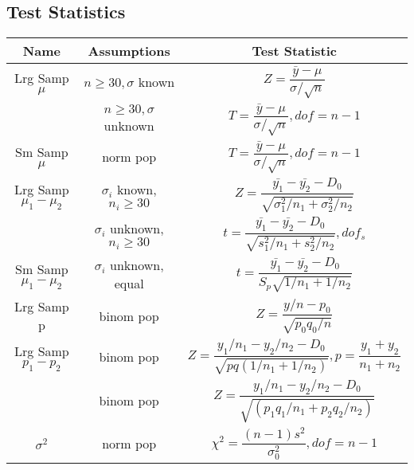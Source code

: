 \documentclass{article}
\begin{document}
\begin{multicols}{2}
\section{Test Statistics}
\begin{tabular}{|c|c|c|}
\hline
Name & Assumptions & Test Statistic \\ \hline
Lrg Samp $\mu$ & $n\geq30, \sigma$ known & $Z = \dfrac{\bar{y}-\mu}{\sigma/\sqrt{n}}$ \\ \hline
& $n\geq30, \sigma$ unknown & $T = \dfrac{\bar{y}-\mu}{\sigma/\sqrt{n}}, dof=n-1$ \\ \hline

Sm Samp $\mu$ & norm pop & $T = \dfrac{\bar{y}-\mu}{\sigma/\sqrt{n}}, dof =n-1$ \\ \hline

Lrg Samp $\mu_1-\mu_2$ & $\sigma_i$ known, $n_i\geq30$ & $Z = \dfrac{\bar{y_1}-\bar{y_2}-D_0}{\sqrt{\sigma_1^2/n_1+\sigma_2^2/n_2}}$ \\ \hline

& $\sigma_i$ unknown, $n_i\geq30$ & $t = \dfrac{\bar{y_1}-\bar{y_2}-D_0}{\sqrt{s_1^2/n_1+s_2^2/n_2}}, dof_s$ \\ \hline

Sm Samp $\mu_1-\mu_2$ & $\sigma_i$ unknown, equal & $t = \dfrac{\bar{y_1}-\bar{y_2}-D_0}{S_p\sqrt{1/n_1+1/n_2}}$ \\ \hline

Lrg Samp p & binom pop & $Z = \dfrac{y/n-p_0}{\sqrt{p_0q_0/n}}$ \\ \hline

Lrg Samp $p_1-p_2$ & binom pop & $Z = \dfrac{y_1/n_1-y_2/n_2-D_0}{\sqrt{pq(1/n_1 + 1/n_2)}}, p = \dfrac{y_1+y_2}{n_1+n_2}$ \\ \hline

& binom pop & $Z = \dfrac{y_1/n_1-y_2/n_2-D_0}{\sqrt{(p_1q_1/n_1 + p_2q_2/n_2)}}$ \\ \hline

$\sigma^2$ & norm pop & $\chi^2 = \dfrac{(n-1)s^2}{\sigma_0^2}, dof = n-1$ \\ \hline


\end{tabular}
\end{multicols}
\end{document}
